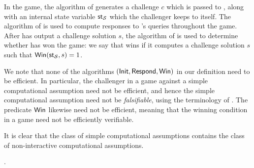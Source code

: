 In the \SICA game, the algorithm \Init of \Simple
generates a challenge \(c\) which is passed to \advA,
along with an internal state variable \(\mathsf{st}_{\mathcal{S}}\)
which the challenger keeps to itself.
The algorithm \Respond of \Simple
is used to compute responses
to \advA's queries throughout the game.
After \advA has output a challenge solution \(s\),
the algorithm \Win of \Simple
is used to determine whether \advA has won the \SICA game:
we say that \advA wins if it computes a challenge solution \(s\)
such that \(\mathsf{Win}(\mathsf{st}_{\mathcal{S}},s) = 1\).

\begin{remark}
  We note that none of the algorithms \((\mathsf{Init},\mathsf{Respond},\mathsf{Win})\)
  in our definition need to be efficient.
  In particular, the challenger in a \SICA
  game against a simple computational assumption
  need not be efficient,
  and hence the simple computational assumption need not be \emph{falsifiable},
  using the terminology of .
  The predicate \(\mathsf{Win}\) likewise need not be efficient,
  meaning that the winning condition in a \SICA game
  need not be efficiently verifiable.
\end{remark}

\begin{remark}
  It is clear that the class of simple computational assumptions
  contains the class of non-interactive computational assumptions.

  .
\end{remark}



